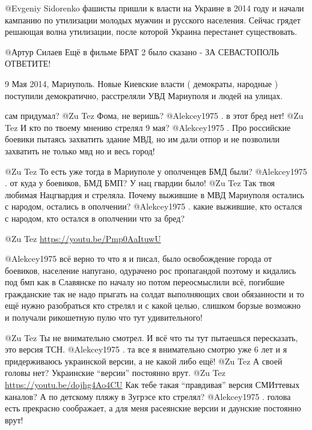 \begin{multicols}{2}
\begin{itemize}

@Evgeniy Sidorenko  фашисты пришли к власти на Украине в 2014 году и начали
кампанию по утилизации молодых мужчин и русского населения. Сейчас грядет
решающая волна утилизации, после которой Украина перестанет существовать.

 @Артур Силаев  Ещё в фильме БРАТ 2 было сказано - ЗА СЕВАСТОПОЛЬ ОТВЕТИТЕ! 

\end{itemize} %


9 Мая 2014, Мариуполь.  Новые Киевские власти ( демократы, народные ) поступили
демократично, расстреляли УВД Мариуполя и людей на улицах. 

\begin{itemize} %
сам придумал?
 @Zu Tez  Фома, не веришь?
 @Alekcey1975  . в этот бред нет!
 @Zu Tez  И кто по твоему мнению стрелял 9 мая?
 @Alekcey1975  . Про российские боевики пытаясь захватить здание МВД, но им
дали отпор и не позволили захватить не только мвд но и весь город! 

 @Zu Tez  То есть уже тогда в Мариуполе у ополченцев БМД были?
 @Alekcey1975  . от куда у боевиков, БМД БМП?  У нац гвардии было!
 @Zu Tez  Так твоя любимая Нацгвардия и стреляла. Почему выжившие в МВД Мариуполя остались с народом, остались в ополчении?
 @Alekcey1975  . какие выжившие, кто остался с народом, кто остался в ополчении что за бред? 

 @Zu Tez  \url{https://youtu.be/Pmp0AaItuwU}

@Alekcey1975  всё верно то что я и писал, было освобождение города от боевиков,
население напугано, одурачено рос пропагандой поэтому и кидались под бмп как в
Славянске по началу но потом переосмыслили всё, погибшие гражданские так не
надо  прыгать на солдат выполняющих свои обязанности  и то ещё нужно
разобраться кто стрелял и с какой целью, слишком борзые возможно и получали
рикошетную пулю что тут удивительного! 

 @Zu Tez  Ты не внимательно смотрел. И всё что ты тут пытаешься пересказать, это версия ТСН.
 @Alekcey1975 . та все я внимательно смотрю уже 6 лет и я придерживаюсь украинской версии, а не какой либо ещё!
 @Zu Tez  А своей головы нет?  Украинские \enquote{версии} постоянно врут.
 @Zu Tez  \url{https://youtu.be/dojhg4Ao4CU} Как тебе такая \enquote{правдивая} версия СМИттевых каналов? 
А по детскому пляжу в Зугрэсе кто стрелял?
 @Alekcey1975  . голова есть прекрасно соображает, а для меня расеянские версии и даунские постоянно врут! 


\end{itemize}
\end{multicols}
